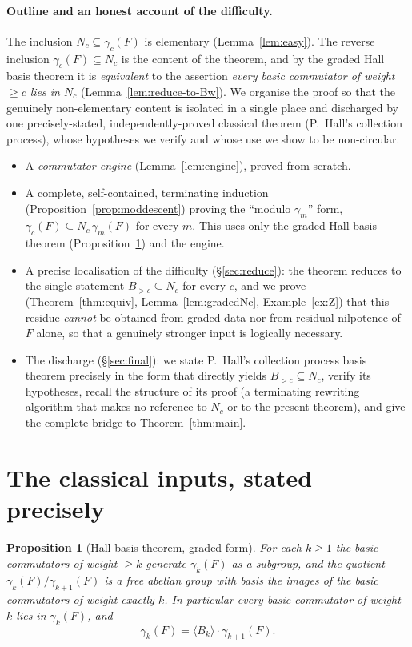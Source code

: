 \documentclass{amsart}
\newtheorem{proposition}{Proposition}
\theoremstyle{definition}
\theoremstyle{remark}
\begin{document}
\paragraph{Outline and an honest account of the difficulty.}
The inclusion $N_c\subseteq\gamma_c(F)$ is elementary (Lemma~\ref{lem:easy}). The
reverse inclusion $\gamma_c(F)\subseteq N_c$ is the content of the theorem, and by
the graded Hall basis theorem it is \emph{equivalent} to the assertion
\emph{every basic commutator of weight $\ge c$ lies in $N_c$}
(Lemma~\ref{lem:reduce-to-Bw}). We organise the proof so that the genuinely
non-elementary content is isolated in a single place and discharged by one
precisely-stated, independently-proved classical theorem (P.~Hall's collection
process), whose hypotheses we verify and whose use we show to be non-circular.
\begin{itemize}
\item[(I)] A \emph{commutator engine} (Lemma~\ref{lem:engine}), proved from
scratch.
\item[(II)] A complete, self-contained, terminating induction
(Proposition~\ref{prop:moddescent}) proving the ``modulo $\gamma_m$'' form,
$\gamma_c(F)\subseteq N_c\,\gamma_m(F)$ for every $m$. This uses only the graded
Hall basis theorem (Proposition~\ref{prop:hall}) and the engine.
\item[(III)] A precise localisation of the difficulty
(\S\ref{sec:reduce}): the theorem reduces to the single statement
$B_{>c}\subseteq N_c$ for every $c$, and we prove
(Theorem~\ref{thm:equiv}, Lemma~\ref{lem:gradedNc}, Example~\ref{ex:Z}) that this
residue \emph{cannot} be obtained from graded data nor from residual nilpotence of
$F$ alone, so that a genuinely stronger input is logically necessary.
\item[(IV)] The discharge (\S\ref{sec:final}): we state P.~Hall's collection
process basis theorem precisely in the form that directly yields
$B_{>c}\subseteq N_c$, verify its hypotheses, recall the structure of its proof
(a terminating rewriting algorithm that makes no reference to $N_c$ or to the
present theorem), and give the complete bridge to Theorem~\ref{thm:main}.
\end{itemize}

\section{The classical inputs, stated precisely}\label{sec:input}

\begin{proposition}[Hall basis theorem, graded form]\label{prop:hall}
For each $k\ge 1$ the basic commutators of weight $\ge k$ generate $\gamma_k(F)$
\emph{as a subgroup}, and the quotient $\gamma_k(F)/\gamma_{k+1}(F)$ is a free
abelian group with basis the images of the basic commutators of weight exactly
$k$. In particular every basic commutator of weight $k$ lies in $\gamma_k(F)$, and
\begin{equation}\label{eq:hall-decomp}
\gamma_k(F)=\langle B_k\rangle\cdot\gamma_{k+1}(F).
\end{equation}
\end{proposition}
\end{document}
